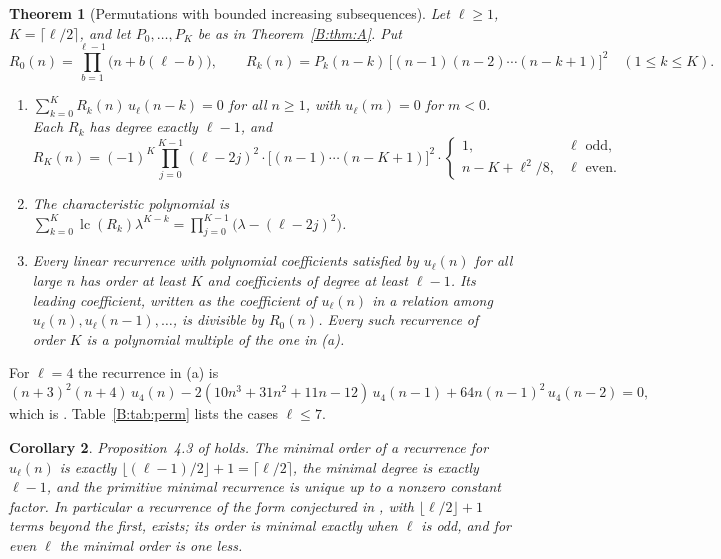 \documentclass[11pt,a4paper]{article}
\newtheorem{theorem}{Theorem}[section]
\newtheorem{corollary}[theorem]{Corollary}
\theoremstyle{definition}
\theoremstyle{remark}
\newcommand{\fl}[1]{\lfloor #1\rfloor}
\newcommand{\cl}[1]{\lceil #1\rceil}
\DeclareMathOperator{\lc}{lc}
\numberwithin{equation}{section}
\begin{document}
\begin{theorem}[Permutations with bounded increasing subsequences]\label{B:thm:B}
Let $\ell\ge1$, $K=\cl{\ell/2}$, and let $P_0,\dots,P_K$ be as in Theorem~\ref{B:thm:A}. Put
\[
R_0(n)=\prod_{b=1}^{\ell-1}\bigl(n+b(\ell-b)\bigr),\qquad R_k(n)=P_k(n-k)\,\bigl[(n-1)(n-2)\cdots(n-k+1)\bigr]^2\quad(1\le k\le K).
\]
\begin{enumerate}
\item[(a)] $\sum_{k=0}^{K}R_k(n)\,u_\ell(n-k)=0$ for all $n\ge1$, with $u_\ell(m)=0$ for $m<0$. Each $R_k$ has degree exactly $\ell-1$, and
\[
R_K(n)=(-1)^K\prod_{j=0}^{K-1}(\ell-2j)^2\cdot\bigl[(n-1)\cdots(n-K+1)\bigr]^2\cdot\begin{cases}1,&\ell\text{ odd},\\ n-K+\ell^2/8,&\ell\text{ even}.\end{cases}
\]
\item[(b)] The characteristic polynomial is $\sum_{k=0}^{K}\lc(R_k)\lambda^{K-k}=\prod_{j=0}^{K-1}\bigl(\lambda-(\ell-2j)^2\bigr)$.
\item[(c)] Every linear recurrence with polynomial coefficients satisfied by $u_\ell(n)$ for all large $n$ has order at least $K$ and coefficients of degree at least $\ell-1$. Its leading coefficient, written as the coefficient of $u_\ell(n)$ in a relation among $u_\ell(n),u_\ell(n-1),\dots$, is divisible by $R_0(n)$. Every such recurrence of order $K$ is a polynomial multiple of the one in (a).
\end{enumerate}
\end{theorem}

For $\ell=4$ the recurrence in (a) is
\[
(n+3)^2(n+4)\,u_4(n)-2(10n^3+31n^2+11n-12)\,u_4(n-1)+64n(n-1)^2\,u_4(n-2)=0,
\]
which is \cite[(4.7)]{FW26}. Table~\ref{B:tab:perm} lists the cases $\ell\le7$.

\begin{corollary}\label{B:cor:FW43}
Proposition~4.3 of \cite{FW26} holds. The minimal order of a recurrence for $u_\ell(n)$ is exactly $\fl{(\ell-1)/2}+1=\cl{\ell/2}$, the minimal degree is exactly $\ell-1$, and the primitive minimal recurrence is unique up to a nonzero constant factor. In particular a recurrence of the form conjectured in \cite{BFK95}, with $\fl{\ell/2}+1$ terms beyond the first, exists; its order is minimal exactly when $\ell$ is odd, and for even $\ell$ the minimal order is one less.
\end{corollary}
\end{document}
